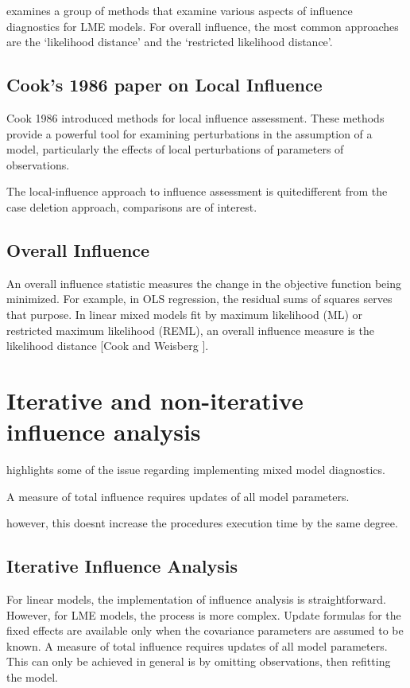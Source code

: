 \documentclass[12pt, a4paper]{article}
\begin{document}
\citet{west} examines a group of methods that examine various aspects of influence diagnostics for LME models.
For overall influence, the most common approaches are the `likelihood distance' and the `restricted likelihood distance'.

\subsection{Cook's 1986 paper on Local Influence}%
Cook 1986 introduced methods for local influence assessment. These methods provide a powerful tool for examining perturbations in the assumption of a model, particularly the effects of local perturbations of parameters of observations.

The local-influence approach to influence assessment is quitedifferent from the case deletion approach, comparisons are of
interest.



\subsection{Overall Influence}
An overall influence statistic measures the change in the objective function being minimized. For example, in
OLS regression, the residual sums of squares serves that purpose. In linear mixed models fit by
 maximum likelihood (ML) or  restricted maximum likelihood (REML), an overall influence measure is the  likelihood distance [Cook and Weisberg ].



\newpage
\section{Iterative and non-iterative influence analysis} %
\citet{schabenberger} highlights some of the issue regarding implementing mixed model diagnostics.

A measure of total influence requires updates of all model parameters.

however, this doesnt increase the procedures execution time by the same degree.
\subsection{Iterative Influence Analysis}

For linear models, the implementation of influence analysis is straightforward.
However, for LME models, the process is more complex. Update formulas for the fixed effects are available only when the covariance parameters are assumed to be known. A measure of total influence requires updates of all model parameters.
This can only be achieved in general is by omitting observations, then refitting the model.
\end{document}
